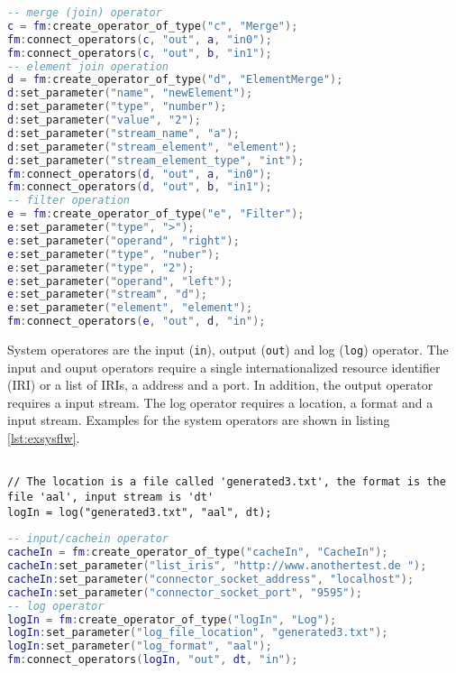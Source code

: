 \begin{lstlisting}[language=Lua, caption={\emph{Generated LUA code of Structural Operators}},label={lst:exanlua}]
-- merge (join) operator
c = fm:create_operator_of_type("c", "Merge");
fm:connect_operators(c, "out", a, "in0");
fm:connect_operators(c, "out", b, "in1");
-- element join operation 
d = fm:create_operator_of_type("d", "ElementMerge");
d:set_parameter("name", "newElement");
d:set_parameter("type", "number");
d:set_parameter("value", "2");
d:set_parameter("stream_name", "a");
d:set_parameter("stream_element", "element");
d:set_parameter("stream_element_type", "int");
fm:connect_operators(d, "out", a, "in0");
fm:connect_operators(d, "out", b, "in1");
-- filter operation 
e = fm:create_operator_of_type("e", "Filter");
e:set_parameter("type", ">");
e:set_parameter("operand", "right");
e:set_parameter("type", "nuber");
e:set_parameter("type", "2");
e:set_parameter("operand", "left");
e:set_parameter("stream", "d");
e:set_parameter("element", "element");
fm:connect_operators(e, "out", d, "in");
\end{lstlisting}
System operatores are the input (\texttt{in}), output (\texttt{out}) and log
(\texttt{log}) operator. The input and ouput operators require a single 
internationalized resource identifier (IRI) or a list of IRIs, a address and a 
port. In addition, the output operator requires a input stream. The log operator
requires a location, a format and a input stream. Examples for the system 
operators are shown in listing \ref{lst:exsysflw}.
\begin{lstlisting}[language=Flow, caption={\emph{Examples of System Operators}},label={lst:exsysflw}]

// The location is a file called 'generated3.txt', the format is the file 'aal', input stream is 'dt'
logIn = log("generated3.txt", "aal", dt);
\end{lstlisting}

\begin{lstlisting}[language=Lua, caption={\emph{Generated LUA code of System Operators}},label={lst:exanlua}]
-- input/cachein operator
cacheIn = fm:create_operator_of_type("cacheIn", "CacheIn");
cacheIn:set_parameter("list_iris", "http://www.anothertest.de ");
cacheIn:set_parameter("connector_socket_address", "localhost");
cacheIn:set_parameter("connector_socket_port", "9595");
-- log operator
logIn = fm:create_operator_of_type("logIn", "Log");
logIn:set_parameter("log_file_location", "generated3.txt");
logIn:set_parameter("log_format", "aal");
fm:connect_operators(logIn, "out", dt, "in");
\end{lstlisting}

